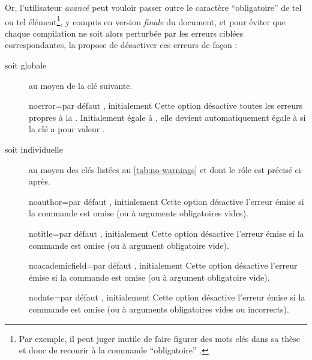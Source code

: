 Or, l'utilisateur \emph{avancé} peut vouloir passer outre le caractère
\enquote{obligatoire} de tel ou tel élément\footnote{Par exemple, il peut juger
  inutile de faire figurer des mots clés dans sa thèse et donc de recourir à la
  commande \enquote{obligatoire} \protect{}.}, y compris en
version \emph{finale} du document, et pour éviter que chaque compilation ne
soit alors perturbée par les erreurs ciblées correspondantes, la \yatcl{}
propose de désactiver ces erreurs de façon :
\begin{description}
\item[soit globale] au moyen de la clé  suivante.
  \begin{docKey}{noerror}{=\textbar{}}{par défaut
      , initialement }
    Cette option désactive toutes les erreurs propres à la
    \yatcl{}. Initialement égale à , elle devient
    automatiquement égale à  si la clé  a pour
    valeur .
  \end{docKey}
\item[soit individuelle] au moyen des clés listées au \vref{tab:no-warnings} et
  dont le rôle est précisé ci-après.
  \begin{docKey}{noauthor}{=\textbar{}}{par défaut
      , initialement }
    Cette option désactive l'erreur émise si la commande  est
    omise (ou à arguments obligatoires vides).
  \end{docKey}
  \begin{docKey}{notitle}{=\textbar{}}{par défaut
      , initialement }
    Cette option désactive l'erreur émise si la commande  est
    omise (ou à argument obligatoire vide).
  \end{docKey}
  \begin{docKey}{noacademicfield}{=\textbar{}}{par
      défaut , initialement }
    Cette option désactive l'erreur émise si la commande 
    est omise (ou à argument obligatoire vide).
  \end{docKey}
  \begin{docKey}{nodate}{=\textbar{}}{par défaut
      , initialement }
    Cette option désactive l'erreur émise si la commande  est
    omise (ou à arguments obligatoires vides ou incorrects).

\end{docKey}
\end{description}
